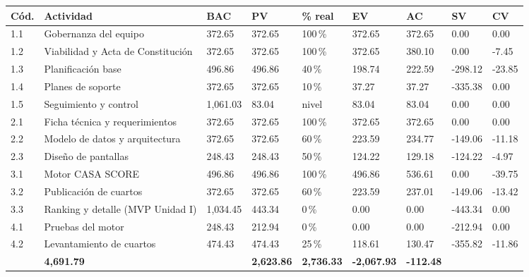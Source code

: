 \documentclass[11pt,a4paper]{article}
\begin{document}
\vspace{0.1cm}
{\footnotesize
\setlength{\tabcolsep}{3pt}
\noindent\begin{tabularx}{\textwidth}{@{}C{0.7cm} L Q{1.4cm} Q{1.35cm} C{0.9cm} Q{1.35cm} Q{1.35cm} Q{1.4cm} Q{1.2cm}@{}}
\toprule
{}
\textbf{Cód.} & \textbf{Actividad} & \textbf{BAC} & \textbf{PV} & \textbf{\% real} & \textbf{EV} & \textbf{AC} & \textbf{SV} & \textbf{CV} \\
 & Gobernanza del equipo & 372.65 & 372.65 & 100\,\% & 372.65 & 372.65 & 0.00 & 0.00 \\
1.2 & Viabilidad y Acta de Constitución & 372.65 & 372.65 & 100\,\% & 372.65 & 380.10 & 0.00 & \textcolor{SevAlta}{-7.45} \\
1.3 & Planificación base & 496.86 & 496.86 & 40\,\% & 198.74 & 222.59 & \textcolor{SevAlta}{-298.12} & \textcolor{SevAlta}{-23.85} \\
1.4 & Planes de soporte & 372.65 & 372.65 & 10\,\% & 37.27 & 37.27 & \textcolor{SevAlta}{-335.38} & 0.00 \\
1.5 & Seguimiento y control & 1,061.03 & 83.04 & nivel & 83.04 & 83.04 & 0.00 & 0.00 \\
2.1 & Ficha técnica y requerimientos & 372.65 & 372.65 & 100\,\% & 372.65 & 372.65 & 0.00 & 0.00 \\
2.2 & Modelo de datos y arquitectura & 372.65 & 372.65 & 60\,\% & 223.59 & 234.77 & \textcolor{SevAlta}{-149.06} & \textcolor{SevAlta}{-11.18} \\
2.3 & Diseño de pantallas & 248.43 & 248.43 & 50\,\% & 124.22 & 129.18 & \textcolor{SevAlta}{-124.22} & \textcolor{SevAlta}{-4.97} \\
3.1 & Motor CASA SCORE & 496.86 & 496.86 & 100\,\% & 496.86 & 536.61 & 0.00 & \textcolor{SevAlta}{-39.75} \\
3.2 & Publicación de cuartos & 372.65 & 372.65 & 60\,\% & 223.59 & 237.01 & \textcolor{SevAlta}{-149.06} & \textcolor{SevAlta}{-13.42} \\
3.3 & Ranking y detalle (MVP Unidad I) & 1,034.45 & 443.34 & 0\,\% & 0.00 & 0.00 & \textcolor{SevAlta}{-443.34} & 0.00 \\
4.1 & Pruebas del motor & 248.43 & 212.94 & 0\,\% & 0.00 & 0.00 & \textcolor{SevAlta}{-212.94} & 0.00 \\
4.2 & Levantamiento de cuartos & 474.43 & 474.43 & 25\,\% & 118.61 & 130.47 & \textcolor{SevAlta}{-355.82} & \textcolor{SevAlta}{-11.86} \\
\midrule
{} & \textbf{4,691.79} & & \textbf{2,623.86} & \textbf{2,736.33} & \textbf{\textcolor{SevAlta}{-2,067.93}} & \textbf{\textcolor{SevAlta}{-112.48}} \\
\bottomrule
\end{tabularx}
}
\end{document}
